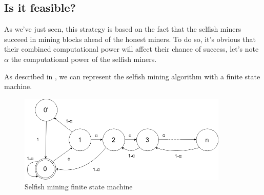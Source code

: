 \begin{figure}[ht]
\centering

\hspace{1cm}
\end{figure}
\medskip

\begin{figure}[ht]
\centering

\hspace{1cm}
\end{figure}

  \subsection{Is it feasible?}

As we've just seen, this strategy is based on the fact that the selfish miners succeed in mining blocks ahead of the honest miners. To do so, it's obvious that their combined computational power will affect their chance of success, let's note $\alpha$ the computational power of the selfish miners.

As described in \cite{majority_not_enough}, we can represent the selfish mining algorithm with a finite state machine. \newline

\begin{figure}[ht]
\centering
\includegraphics[width=10cm]{Figures/finiteState}
\caption{Selfish mining finite state machine}
\end{figure}
\medskip

